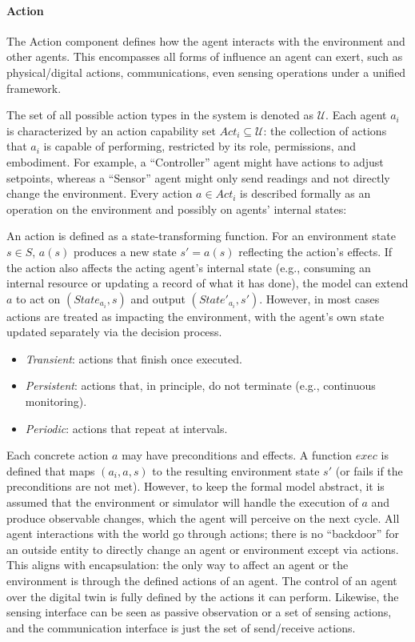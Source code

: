 \paragraph{Action}

The Action component defines how the agent interacts with the environment and other agents. This encompasses all forms of influence an agent can exert, such as physical/digital actions, communications, even sensing operations under a unified framework. 

The set of all possible action types in the system is denoted as $\mathcal{U}$. Each agent $a_i$ is characterized by an action capability set $Act_i \subseteq \mathcal{U}$: the collection of actions that $a_i$ is capable of performing, restricted by its role, permissions, and embodiment. For example, a “Controller” agent might have actions to adjust setpoints, whereas a “Sensor” agent might only send readings and not directly change the environment. Every action $a \in Act_i$ is described formally as an operation on the environment and possibly on agents’ internal states:

An action is defined as a state-transforming function. For an environment state $s \in S$, $a(s)$ produces a new state $s' = a(s)$ reflecting the action’s effects. If the action also affects the acting agent’s internal state (e.g., consuming an internal resource or updating a record of what it has done), the model can extend $a$ to act on $(State_{a_i}, s)$ and output $(State'_{a_i}, s')$. However, in most cases actions are treated as impacting the environment, with the agent’s own state updated separately via the decision process. 

\begin{itemize}
    \item \emph{Transient}: actions that finish once executed.
    \item \emph{Persistent}: actions that, in principle, do not terminate (e.g., continuous monitoring).
    \item \emph{Periodic}: actions that repeat at intervals.
\end{itemize}




Each concrete action $a$ may have preconditions and effects. A function $\mathit{exec}$ is defined that maps $(a_i, a, s)$ to the resulting environment state $s'$ (or fails if the preconditions are not met). However, to keep the formal model abstract, it is assumed that the environment or simulator will handle the execution of $a$ and produce observable changes, which the agent will perceive on the next cycle. All agent interactions with the world go through actions; there is no “backdoor” for an outside entity to directly change an agent or environment except via actions. This aligns with encapsulation: the only way to affect an agent or the environment is through the defined actions of an agent. The control of an agent over the digital twin is fully defined by the actions it can perform. Likewise, the sensing interface can be seen as passive observation or a set of sensing actions, and the communication interface is just the set of send/receive actions.



